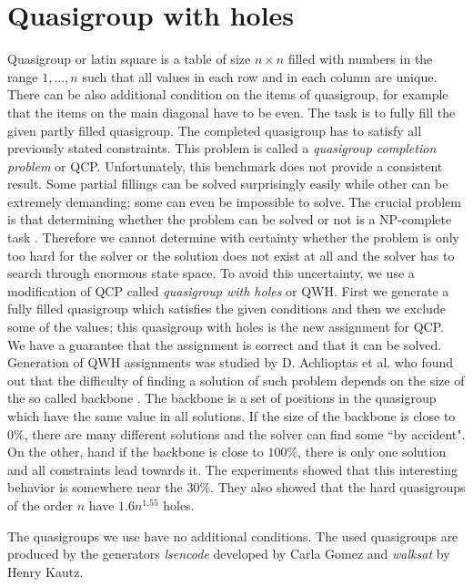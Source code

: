 \section{Quasigroup with holes}
Quasigroup or latin square is a table of size $n \times n$ filled with numbers in the
range $1,...,n$ such that all values in each row and in each column are unique. There
can be also additional condition on the items of quasigroup, for example that the 
items on the main diagonal have to be even. The task is to fully fill the 
given partly filled quasigroup. The completed quasigroup has to satisfy all previously
stated constraints. This problem is called a {\em quasigroup completion problem} or QCP.
Unfortunately, this benchmark does not provide a consistent result. Some partial fillings
can be solved surprisingly easily while other can be extremely demanding; 
some can even be impossible to solve. The crucial problem is that determining whether the problem can
be solved or not is a NP-complete task \cite{Achlioptas00generatingsatisfiable}. Therefore we cannot determine with certainty whether the problem is only
too hard for the solver or the solution does not exist at all and the solver has to search 
through enormous state space. To avoid this uncertainty, we use a modification of
QCP called {\em quasigroup with holes} or QWH. First we generate a fully filled quasigroup
which satisfies the given conditions and then we exclude some of the values; this quasigroup
with holes is the new assignment for QCP. We have a guarantee that the assignment is correct
and that it can be solved. Generation of QWH assignments was studied by D. Achlioptas
et al. who found out that the difficulty of finding a solution of such problem depends on the size of the
so called backbone \cite{Achlioptas00generatingsatisfiable}. The backbone is a set 
of positions in the quasigroup which have the same value in all solutions.
If the size of the backbone is close to $0 \%$, there are many different solutions and
the solver can find some ``by accident". On the other, hand if the backbone is close
to $100 \%$, there is only one solution and all constraints lead towards it.
The experiments \cite{Achlioptas00generatingsatisfiable} showed that this interesting 
behavior is somewhere near the $30 \%$. They also showed that the hard quasigroups of the order
 $n$ have $1.6 n^{1.55}$ holes.


The quasigroups we use have no additional conditions. The used quasigroups are produced
by the generators {\em lsencode} developed by Carla Gomez and {\em walksat} by Henry Kautz. 
 
